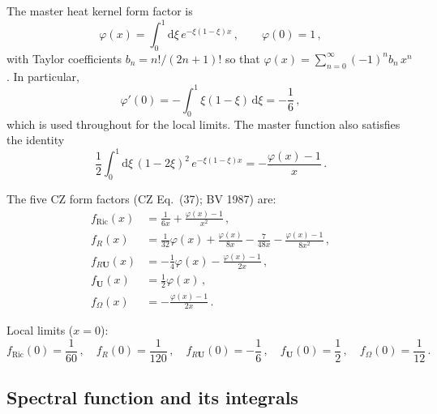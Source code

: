 \documentclass[11pt,a4paper]{article}
\renewcommand{\dd}{\mathrm{d}}
\theoremstyle{definition}
\theoremstyle{remark}
\begin{document}
The master heat kernel form factor is
\begin{equation}
  \varphi(x) = \int_0^1 \dd\xi\, e^{-\xi(1-\xi)x}\,,
  \qquad \varphi(0) = 1\,,
  \label{eq:master-phi}
\end{equation}
with Taylor coefficients $b_n = n!/(2n+1)!$ so that
$\varphi(x) = \sum_{n=0}^\infty (-1)^n b_n\,x^n$.
In particular,
\begin{equation}
  \varphi'(0) = -\int_0^1 \xi(1-\xi)\,\dd\xi = -\frac{1}{6}\,,
  \label{eq:phi-prime-zero}
\end{equation}
which is used throughout for the local limits.
The master function also satisfies the identity
\begin{equation}
  \frac{1}{2}\int_0^1 \dd\xi\,(1-2\xi)^2\,e^{-\xi(1-\xi)x}
  = -\frac{\varphi(x)-1}{x}\,.
  \label{eq:phi-identity}
\end{equation}

The five CZ form factors (CZ Eq.~(37); BV 1987) are:
\begin{equation}
  \begin{aligned}
  f_{\text{Ric}}(x)
    &= \frac{1}{6x} + \frac{\varphi(x)-1}{x^2}\,,\\[3pt]
  f_R(x)
    &= \frac{1}{32}\varphi(x) + \frac{\varphi(x)}{8x}
       - \frac{7}{48x}
       - \frac{\varphi(x)-1}{8x^2}\,,\\[3pt]
  f_{R\mathbf{U}}(x)
    &= -\frac{1}{4}\varphi(x)
       - \frac{\varphi(x)-1}{2x}\,,\\[3pt]
  f_{\mathbf{U}}(x) &= \frac{1}{2}\varphi(x)\,,\\[3pt]
  f_{\Omega}(x) &= -\frac{\varphi(x)-1}{2x}\,.
  \end{aligned}
  \label{eq:CZ-ff}
\end{equation}

Local limits ($x = 0$):
\begin{equation}
  f_{\text{Ric}}(0) = \frac{1}{60}\,,\quad
  f_R(0) = \frac{1}{120}\,,\quad
  f_{R\mathbf{U}}(0) = -\frac{1}{6}\,,\quad
  f_{\mathbf{U}}(0) = \frac{1}{2}\,,\quad
  f_{\Omega}(0) = \frac{1}{12}\,.
  \label{eq:CZ-local}
\end{equation}


\subsection{Spectral function and its integrals}
\end{document}
